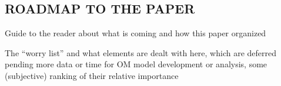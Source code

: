 \documentclass[11pt]{book}\usepackage[]{graphicx}\usepackage[]{color}
\begin{document}
\subsection{ROADMAP TO THE PAPER}

\begin{resdoclist}
\item Guide to the reader about what is coming and how this paper organized
\item The ``worry list'' and what elements are dealt with here, which are deferred pending more data or time for OM model development or analysis, some (subjective) ranking of their relative importance

\end{resdoclist}

\end{document}
